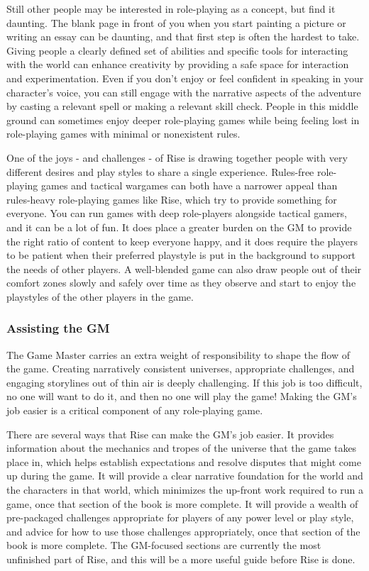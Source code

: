       Still other people may be interested in role-playing as a concept, but find it daunting.
      The blank page in front of you when you start painting a picture or writing an essay can be daunting, and that first step is often the hardest to take.
      Giving people a clearly defined set of abilities and specific tools for interacting with the world can enhance creativity by providing a safe space for interaction and experimentation.
      Even if you don't enjoy or feel confident in speaking in your character's voice, you can still engage with the narrative aspects of the adventure by casting a relevant spell or making a relevant skill check.
      People in this middle ground can sometimes enjoy deeper role-playing games while being feeling lost in role-playing games with minimal or nonexistent rules.

      One of the joys - and challenges - of Rise is drawing together people with very different desires and play styles to share a single experience.
      Rules-free role-playing games and tactical wargames can both have a narrower appeal than rules-heavy role-playing games like Rise, which try to provide something for everyone.
      You can run games with deep role-players alongside tactical gamers, and it can be a lot of fun.
      It does place a greater burden on the GM to provide the right ratio of content to keep everyone happy, and it does require the players to be patient when their preferred playstyle is put in the background to support the needs of other players.
      A well-blended game can also draw people out of their comfort zones slowly and safely over time as they observe and start to enjoy the playstyles of the other players in the game.

    \subsubsection{Assisting the GM}
      The Game Master carries an extra weight of responsibility to shape the flow of the game.
      Creating narratively consistent universes, appropriate challenges, and engaging storylines out of thin air is deeply challenging.
      If this job is too difficult, no one will want to do it, and then no one will play the game!
      Making the GM's job easier is a critical component of any role-playing game.

      There are several ways that Rise can make the GM's job easier.
      It provides information about the mechanics and tropes of the universe that the game takes place in, which helps establish expectations and resolve disputes that might come up during the game.
      It will provide a clear narrative foundation for the world and the characters in that world, which minimizes the up-front work required to run a game, once that section of the book is more complete.
      It will provide a wealth of pre-packaged challenges appropriate for players of any power level or play style, and advice for how to use those challenges appropriately, once that section of the book is more complete.
      The GM-focused sections are currently the most unfinished part of Rise, and this will be a more useful guide before Rise is done.

